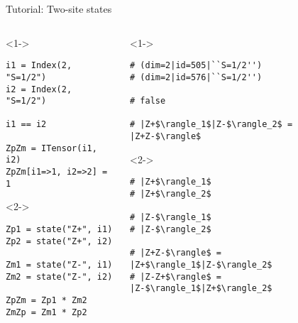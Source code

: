 \begin{frame}[fragile]{Tutorial: Two-site states}

\begin{columns}

\begin{column}{4.5cm}

\begin{onlyenv}<1->

\begin{lstlisting}[language=JuliaLocal, style=julia, basicstyle=\small]
i1 = Index(2, "S=1/2")
i2 = Index(2, "S=1/2")

i1 == i2

ZpZm = ITensor(i1, i2)
ZpZm[i1=>1, i2=>2] = 1
\end{lstlisting}

\end{onlyenv}

\begin{onlyenv}<2->

\begin{lstlisting}[language=JuliaLocal, style=julia, basicstyle=\small]
Zp1 = state("Z+", i1)
Zp2 = state("Z+", i2)

Zm1 = state("Z-", i1)
Zm2 = state("Z-", i2)

ZpZm = Zp1 * Zm2
ZmZp = Zm1 * Zp2
\end{lstlisting}

\end{onlyenv}

\end{column}

\begin{column}{5cm}

\begin{onlyenv}<1->

\begin{lstlisting}[style=julia, numbers=none, mathescape, basicstyle=\small]
# (dim=2|id=505|``S=1/2'')
# (dim=2|id=576|``S=1/2'')
 
# false

# |Z+$\rangle_1$|Z-$\rangle_2$ = |Z+Z-$\rangle$
 \end{lstlisting}

\end{onlyenv}

\begin{onlyenv}<2->

\begin{lstlisting}[style=julia, numbers=none, mathescape, basicstyle=\small]
# |Z+$\rangle_1$
# |Z+$\rangle_2$

# |Z-$\rangle_1$
# |Z-$\rangle_2$

# |Z+Z-$\rangle$ = |Z+$\rangle_1$|Z-$\rangle_2$
# |Z-Z+$\rangle$ = |Z-$\rangle_1$|Z+$\rangle_2$
\end{lstlisting}

\end{onlyenv}

\end{column}

\end{columns}

\end{frame}
